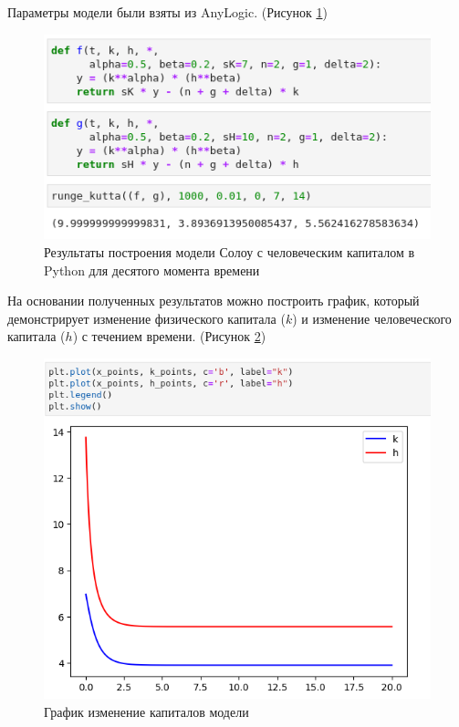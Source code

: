 \documentclass[14pt,fleqn]{extarticle}
\begin{document}
	Параметры модели были взяты из AnyLogic. (Рисунок \ref{fig:M-R-W_python_result})
	\begin{figure}[h]
		\centering \includegraphics[scale=0.5]{M-R-W_python_result}
		\caption{Результаты построения модели Солоу с человеческим капиталом в Python для десятого момента времени}
		\label{fig:M-R-W_python_result}
	\end{figure}
	
	\newpage
	
	На основании полученных результатов можно построить график, который демонстрирует изменение физического капитала ($k$) и изменение человеческого капитала ($h$) с течением времени. (Рисунок \ref{fig:M-R-W_python_result_plot})
	\begin{figure}[h]
		\centering \includegraphics[scale=0.4]{M-R-W_python_result_plot}
		\caption{График изменение капиталов модели}
		\label{fig:M-R-W_python_result_plot}
	\end{figure}
	
\end{document}
